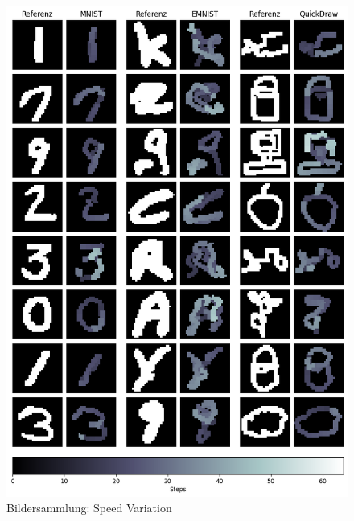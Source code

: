 \begin{figure}[!ht]
    \centering
    \includegraphics[width=\textwidth]{images/resultate/speed.png}
    \caption{Bildersammlung: Speed Variation}\label{fig:r-speed}
\end{figure}

\newpage

